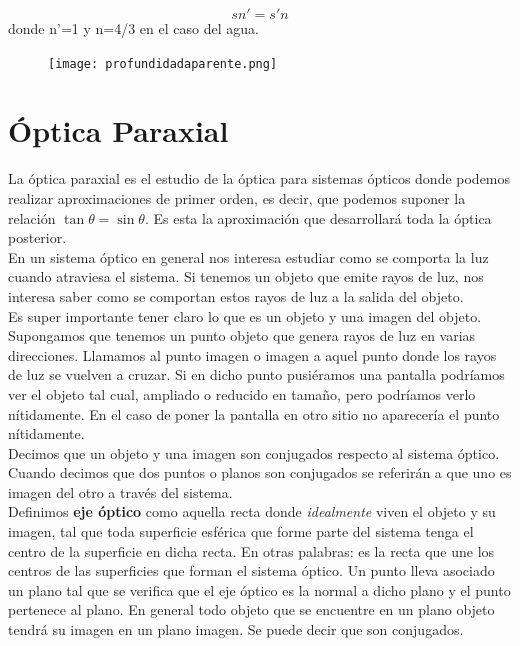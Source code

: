 \documentclass[12pt,a4paper]{article}
\numberwithin{equation}{section}
\numberwithin{figure}{section}
\begin{document}
\begin{equation}
s n' = s' n
\end{equation}
donde n'=1 y n=4/3 en el caso del agua.


\begin{figure}[h!] \centering
\texttt{[image: profundidadaparente.png]}
\end{figure}

\newpage

\section{Óptica Paraxial}

La óptica paraxial es el estudio de la óptica para sistemas ópticos donde podemos realizar aproximaciones de primer orden, es decir, que podemos suponer la relación $\tan \theta = \sin \theta$. Es esta la aproximación que desarrollará toda la óptica posterior.\\

En un sistema óptico en general nos interesa estudiar como se comporta la luz cuando atraviesa el sistema. Si tenemos un objeto que emite rayos de luz, nos interesa saber como se comportan estos rayos de luz a la salida del objeto. \\

Es super importante tener claro lo que es un objeto y una imagen del objeto. Supongamos que tenemos un punto objeto que genera rayos de luz en varias direcciones. Llamamos al punto imagen o imagen a aquel punto donde los rayos de luz se vuelven a cruzar. Si en dicho punto pusiéramos una pantalla podríamos ver el objeto tal cual, ampliado o reducido en tamaño, pero podríamos verlo nítidamente. En el caso de poner la pantalla en otro sitio no aparecería el punto nítidamente. \\

Decimos que un objeto y una imagen son conjugados respecto al sistema óptico. Cuando decimos que dos puntos o planos son conjugados se referirán a que uno es imagen del otro a través del sistema. \\

Definimos \textbf{eje óptico} como aquella recta donde \textit{idealmente} viven el objeto y su imagen, tal que toda superficie esférica que forme parte del sistema tenga el centro de la superficie en dicha recta. En otras palabras: es la recta que une los centros de las superficies que forman el sistema óptico. Un punto lleva asociado un plano tal que se verifica que el eje óptico es la normal a dicho plano y el punto pertenece al plano. En general todo objeto que se encuentre en un plano objeto tendrá su imagen en un plano imagen. Se puede decir que son conjugados. \\
\end{document}
